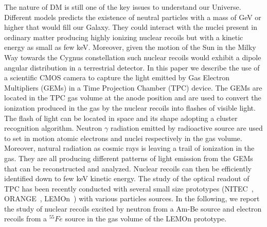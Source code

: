 \documentclass[12pt]{iopart}
\begin{document}
The nature of DM is still one of the key  issues to understand  our Universe. Different models  predicts the existence of neutral particles with a mass of GeV  or higher that would fill our Galaxy. They  could interact with the nuclei present in ordinary matter producing highly ionizing nuclear recoils but with a  kinetic energy as small as  few keV. Moreover, given the motion of the Sun in the Milky Way towards the Cygnus constellation such nuclear recoils would exhibit a dipole angular distribution in a terrestrial detector.
In this paper we describe the use of a scientific CMOS camera to capture the light emitted by Gas Electron Multipliers (GEMs) in a Time Projection Chamber (TPC) device. The GEMs are located in the TPC gas volume at the anode position and are used to convert the ionization produced in the gas by   the  nuclear recoils into flashes of visible light. The flash of light can be located in space and its shape adopting a cluster  recognition algorithm. Neutron $\gamma$ radiation emitted by radioactive source are used to  set in motion  atomic electrons and nuclei respectively in the gas volume. Moreover, natural radiation as cosmic rays is leaving a trail of ionization in the gas. They are all producing different  patterns of light emission from the GEMs that can be reconstructed and analyzed. Nuclear recoils can then be efficiently identified down to few keV kinetic energy. 
 The study of the optical readout of TPC has been recently conducted with several small size prototypes (NITEC~\cite{JINST:nitec}, ORANGE~\cite{NIM:Marafinietal, bib:jinst_orange2}, LEMOn~\cite{bib:eps, bib:ieee17, bib:elba}) with various particles sources. In the following, we report the study of nuclear recoils excited by neutron from a  Am-Be source and electron recoils from a $^{55}Fe$ source in the gas volume of the  LEMOn prototype.
\end{document}

